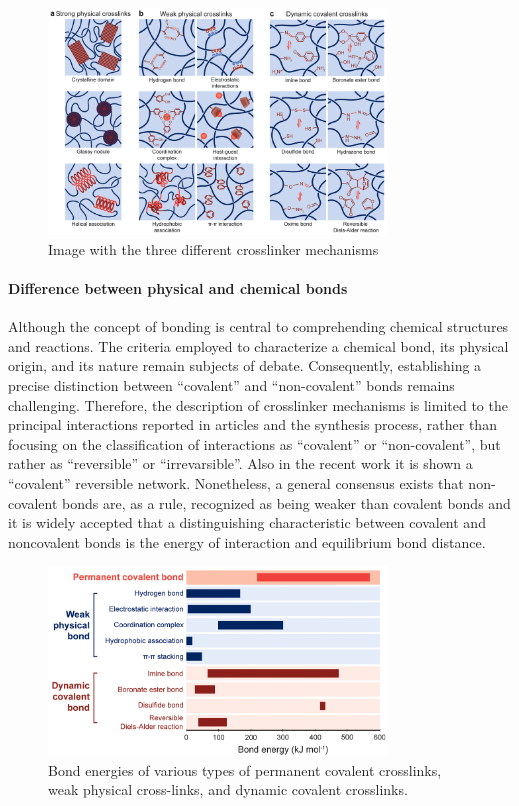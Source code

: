 \begin{figure}[!ht]
    \centering
    \includegraphics[width=0.8\textwidth]{figs/crosslinker_mechanisms.png}
    \caption{Image with the three different crosslinker mechanisms}
\end{figure}

\paragraph{Difference between physical and chemical bonds}
Although the concept of bonding is central to comprehending chemical structures and reactions.
The criteria employed to characterize a chemical bond, its physical origin, and its nature remain subjects of debate\citep{kumarDevelopingCriterionCharacterize2021}.
Consequently, establishing a precise distinction between ``covalent'' and ``non-covalent'' bonds remains challenging.
Therefore, the description of crosslinker mechanisms is limited to the principal interactions reported in articles and the synthesis process, rather than focusing on the classification of interactions as ``covalent'' or ``non-covalent'', but rather as ``reversible'' or ``irrevarsible''.
Also in the recent work \citep{picchioniHydrogelsBasedDynamic2018} it is shown a ``covalent'' reversible network. 
Nonetheless, a general consensus exists that non-covalent bonds are, as a rule, recognized as being weaker than covalent bonds and it is widely accepted that a distinguishing characteristic between covalent and noncovalent bonds is the energy of interaction and equilibrium bond distance\citep{kumarDevelopingCriterionCharacterize2021,novikovNonCovalentInteractionsPolymers2023}.

\begin{figure}[!ht]
    \centering
    \includegraphics[width=0.8\textwidth]{figs/bonds_energy.png}
    \caption{Bond energies of various types of permanent covalent crosslinks, weak physical cross-links, and dynamic covalent crosslinks.}
\end{figure}

